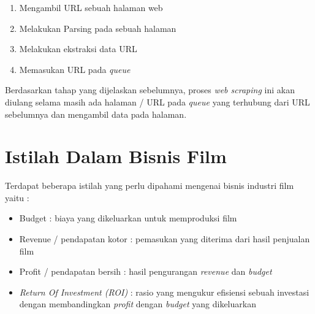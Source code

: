 \begin{enumerate}
\item Mengambil URL sebuah halaman web
\item Melakukan Parsing pada sebuah halaman 
\item Melakukan ekstraksi data URL 
\item Memasukan URL pada \textit{queue}
\end{enumerate}

Berdasarkan tahap yang dijelaskan sebelumnya, proses \textit{web scraping} ini akan diulang selama masih ada halaman / URL pada \textit{queue} yang terhubung dari URL sebelumnya dan mengambil data pada halaman.

\section{Istilah Dalam Bisnis Film}
Terdapat beberapa istilah yang perlu dipahami mengenai bisnis industri film yaitu :

\begin{itemize}
\item Budget : biaya yang dikeluarkan untuk memproduksi film 
\item Revenue / pendapatan kotor : pemasukan yang diterima dari hasil penjualan film 
\item Profit / pendapatan bersih : hasil pengurangan \textit{revenue} dan \textit{budget}

\item \textit{Return Of Investment (ROI)} :  rasio yang mengukur efisiensi sebuah investasi dengan membandingkan \textit{profit} dengan \textit{budget} yang dikeluarkan
\end{itemize}

